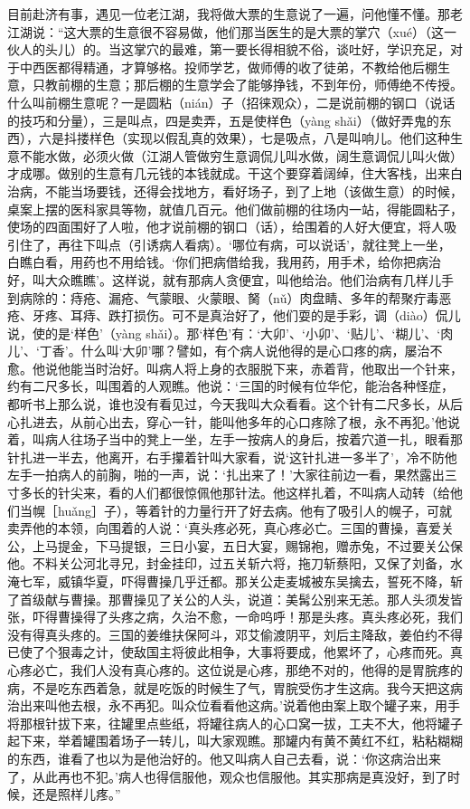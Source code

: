 \documentclass[12pt,UTF8]{ctexbook}
\begin{document}
目前赴济有事，遇见一位老江湖，我将做大票的生意说了一遍，问他懂不懂。那老江湖说：“这大票的生意很不容易做，他们那当医生的是大票的掌穴（xué）（这一伙人的头儿）的。当这掌穴的最难，第一要长得相貌不俗，谈吐好，学识充足，对于中西医都得精通，才算够格。投师学艺，做师傅的收了徒弟，不教给他后棚生意，只教前棚的生意；那后棚的生意学会了能够挣钱，不到年份，师傅绝不传授。什么叫前棚生意呢？一是圆粘（nián）子（招徕观众），二是说前棚的钢口（说话的技巧和分量），三是叫点，四是卖弄，五是使样色（yàng shǎi）（做好弄鬼的东西），六是抖搂样色（实现以假乱真的效果），七是吸点，八是叫响儿。他们这种生意不能水做，必须火做（江湖人管做穷生意调侃儿叫水做，阔生意调侃儿叫火做）才成哪。做别的生意有几元钱的本钱就成。干这个要穿着阔绰，住大客栈，出来白治病，不能当场要钱，还得会找地方，看好场子，到了上地（该做生意）的时候，桌案上摆的医科家具等物，就值几百元。他们做前棚的往场内一站，得能圆粘子，使场的四面围好了人啦，他才说前棚的钢口（话），给围着的人好大便宜，将人吸引住了，再往下叫点（引诱病人看病）。‘哪位有病，可以说话’，就往凳上一坐，白瞧白看，用药也不用给钱。‘你们把病借给我，我用药，用手术，给你把病治好，叫大众瞧瞧’。这样说，就有那病人贪便宜，叫他给治。他们治病有几样儿手到病除的：痔疮、漏疮、气蒙眼、火蒙眼、胬（nǔ）肉盘睛、多年的帮聚疔毒恶疮、牙疼、耳痔、跌打损伤。可不是真治好了，他们耍的是手彩，调（diào）侃儿说，使的是‘样色’（yàng shǎi）。那‘样色’有：‘大卯’、‘小卯’、‘贴儿’、‘糊儿’、‘肉儿’、‘丁香’。什么叫‘大卯’哪？譬如，有个病人说他得的是心口疼的病，屡治不愈。他说他能当时治好。叫病人将上身的衣服脱下来，赤着背，他取出一个针来，约有二尺多长，叫围着的人观瞧。他说：‘三国的时候有位华佗，能治各种怪症，都听书上那么说，谁也没有看见过，今天我叫大众看看。这个针有二尺多长，从后心扎进去，从前心出去，穿心一针，能叫他多年的心口疼除了根，永不再犯。’他说着，叫病人往场子当中的凳上一坐，左手一按病人的身后，按着穴道一扎，眼看那针扎进一半去，他离开，右手攥着针叫大家看，说‘这针扎进一多半了’，冷不防他左手一拍病人的前胸，啪的一声，说：‘扎出来了！’大家往前边一看，果然露出三寸多长的针尖来，看的人们都很惊佩他那针法。他这样扎着，不叫病人动转（给他们当幌［huǎng］子），等着针的力量行开了好去病。他有了吸引人的幌子，可就卖弄他的本领，向围着的人说：‘真头疼必死，真心疼必亡。三国的曹操，喜爱关公，上马提金，下马提银，三日小宴，五日大宴，赐锦袍，赠赤兔，不过要关公保他。不料关公河北寻兄，封金挂印，过五关斩六将，拖刀斩蔡阳，又保了刘备，水淹七军，威镇华夏，吓得曹操几乎迁都。那关公走麦城被东吴擒去，誓死不降，斩了首级献与曹操。那曹操见了关公的人头，说道：美髯公别来无恙。那人头须发皆张，吓得曹操得了头疼之病，久治不愈，一命呜呼！那是头疼。真头疼必死，我们没有得真头疼的。三国的姜维扶保阿斗，邓艾偷渡阴平，刘后主降敌，姜伯约不得已使了个狠毒之计，使敌国主将彼此相争，大事将要成，他累坏了，心疼而死。真心疼必亡，我们人没有真心疼的。这位说是心疼，那绝不对的，他得的是胃脘疼的病，不是吃东西着急，就是吃饭的时候生了气，胃脘受伤才生这病。我今天把这病治出来叫他去根，永不再犯。叫众位看看他这病。’说着他由案上取个罐子来，用手将那根针拔下来，往罐里点些纸，将罐往病人的心口窝一拔，工夫不大，他将罐子起下来，举着罐围着场子一转儿，叫大家观瞧。那罐内有黄不黄红不红，粘粘糊糊的东西，谁看了也以为是他治好的。他又叫病人自己去看，说：‘你这病治出来了，从此再也不犯。’病人也得信服他，观众也信服他。其实那病是真没好，到了时候，还是照样儿疼。”
\end{document}
